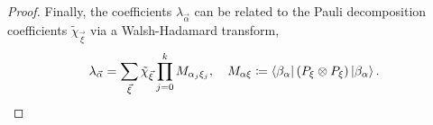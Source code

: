 \begin{proof}
    Finally, the coefficients \(\lambda_{\vec{\alpha}}\) can be related to the Pauli decomposition coefficients \(\tilde{\chi}_{\vec{\xi}}\) via a Walsh-Hadamard transform,
    \begin{equation}
        \lambda_{\vec{\alpha}} = \sum_{\vec{\xi}} \tilde{\chi}_{\vec{\xi}} \prod_{j=0}^k M_{\alpha_j\xi_j}, \quad M_{\alpha\xi} \coloneq \bra{\beta_\alpha}(P_\xi\otimes P_\xi)\ket{\beta_\alpha}.
    \end{equation}
\end{proof}